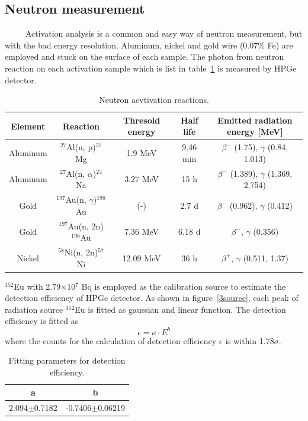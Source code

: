   \subsection{Neutron measurement}
~~~~~Activation analysis is a common and easy way of neutron measurement, but with the bad energy resolution.
Aluminum, nickel and gold wire (0.07\% Fe) are employed and stuck on the surface of each sample.
The photon from neutron reaction on each activation sample which is list in table~\ref{act} is measured by HPGe detector.
\begin{table}[H]
 \centering
 \begin{tabular}{ccccc} \hline \hline
  Element & Reaction & Thresold energy & Half life & Emitted radiation energy [MeV] \\ \hline
  Aluminum & $^{27}$Al(n, p)$^{27}$Mg & 1.9 MeV & 9.46 min & $\beta^-$ (1.75), $\gamma$ (0.84, 1.013) \\
  Aluminum & $^{27}$Al(n, $\alpha$)$^{24}$Na & 3.27 MeV & 15 h & $\beta^-$ (1.389), $\gamma$ (1.369, 2.754) \\
  Gold & $^{197}$Au(n, $\gamma$)$^{198}$Au & (-) & 2.7 d & $\beta^-$ (0.962), $\gamma$ (0.412) \\
  Gold & $^{197}$Au(n, 2n)$^{196}$Au & 7.36 MeV & 6.18 d & $\beta^-$, $\gamma$ (0.356) \\
  Nickel & $^{58}$Ni(n, 2n)$^{57}$Ni & 12.09 MeV & 36 h & $\beta^+$, $\gamma$ (0.511, 1.37) \\ \hline \hline
 \end{tabular}
 \caption{Neutron acvtivation reactions.}
 \label{act}
\end{table}
$^{152}$Eu with 2.79$\times$10$^7$ Bq is employed as the calibration source to estimate the detection efficiency of HPGe detector.
As shown in figure~\ref{3source}, each peak of radiation source $^{152}$Eu is fitted as gaussian and linear function.
The detection efficiency is fitted as
\begin{equation}
 \epsilon = a \cdot E^b
\end{equation}
where the counts for the calculation of detection efficiency $\epsilon$ is within 1.78$\sigma$.
\begin{table}[H]
 \centering
 \begin{tabular}{cc} \hline \hline
  a & b \\ \hline
  2.094$\pm$0.7182 & -0.7406$\pm$0.06219 \\ \hline \hline
 \end{tabular}
 \caption{Fitting parameters for detection efficiency.}
\end{table}

